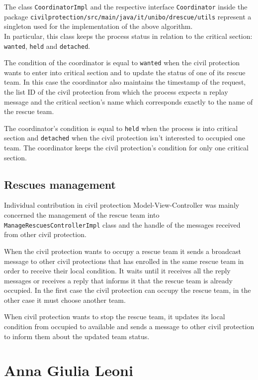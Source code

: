 \documentclass[a4paper,12pt]{report}
\begin{document}
The class \texttt{CoordinatorImpl} and the respective interface \texttt{Coordinator} inside the package \texttt{civilprotection/src/main/java/it/unibo/drescue/utils} represent a singleton used for the implementation of the above algorithm.\\
In particular, this class keeps the process status in relation to the critical section: \texttt{wanted}, \texttt{held} and \texttt{detached}.

The condition of the coordinator is equal to \texttt{wanted} when the civil protection wants to enter into critical section and to update the status of one of its rescue team. 
In this case the coordinator also maintains the timestamp of the request, the list ID of the civil protection from which the process expects n replay message and the critical section's name which corresponds exactly to the name of the rescue team.

The coordinator's condition is equal to \texttt{held} when the process is into critical section and \texttt{detached} when the civil protection isn't interested to occupied one team.
The coordinator keeps the civil protection's condition for only one critical section.\\

\subsection{Rescues management}
Individual contribution in civil protection Model-View-Controller was mainly concerned the management of the rescue team into \texttt{ManageRescuesControllerImpl} class and the handle of the  messages received from other civil protection.

When the civil protection wants to occupy a rescue team it sends a broadcast message to other civil protections that has enrolled in the same rescue team in order to receive their local condition.
It waits until it receives all the reply messages or receives a reply that informs it that the rescue team is already occupied.
In the first case the civil protection can occupy the rescue team, in the other case it must choose another team.

When civil protection wants to stop the rescue team, it updates its local condition from occupied to available and sends a message to other civil protection to inform them about the updated team status.

\section{Anna Giulia Leoni}
\end{document}
